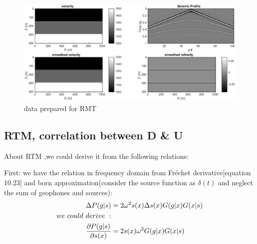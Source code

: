 \documentclass[a4paper]{article}
\begin{document}
	\begin{figure}[ht]
		\centering
		\includegraphics[width=1\linewidth]{./fig/rtm_simuationData.eps}
		\caption{data prepared for RMT}
		\label{rtm_simD}
	\end{figure}

	\subsection{RTM, correlation between D \& U}

	About RTM ,we could derive it from the following relations:\par
	First: we have the relation in frequency domain from  Fréchet derivative\cite{SI}[equation 10.23] and born approximation(consider the source function as $\delta(t)$ and neglect the sum of geophones and sources):
	\begin{align}
		\Delta P(g|s)& =2\omega^2s(x)\Delta s(x)G(g|x)G(x|s)\\
		we\ could\ derive\ :&\notag\\
		\frac{\partial P(g|s)}{\partial s(x)}&=2s(x)\omega^2G(g|x)G(x|s) \label{FE}
	\end{align}
\end{document}
